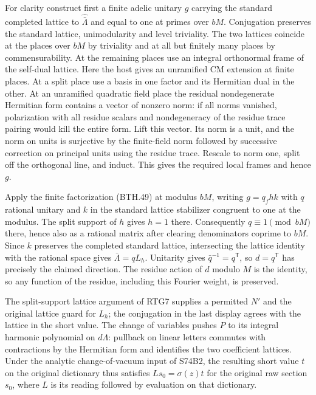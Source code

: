 For clarity construct first a finite adelic unitary $g$ carrying the
standard completed lattice to $\widehat{\bar\Lambda}$ and equal to
one at primes over $bM$. Conjugation preserves the standard lattice,
unimodularity and level triviality. The two lattices coincide at the
places over $bM$ by triviality and at all but finitely many places by
commensurability. At the remaining places use an integral orthonormal
frame of the self-dual lattice. Here the host gives an unramified CM
extension at finite places. At a split place use a basis in one factor
and its Hermitian dual in the other. At an unramified quadratic field
place the residual nondegenerate Hermitian form contains a vector of
nonzero norm: if all norms vanished, polarization with all residue
scalars and nondegeneracy of the residue trace pairing would kill the
entire form. Lift this vector. Its norm is a unit, and the norm on
units is surjective by the finite-field norm followed by successive
correction on principal units using the residue trace. Rescale to norm
one, split off the orthogonal line, and induct. This gives the required
local frames and hence $g$.

Apply the finite factorization (BTH.49) at modulus $bM$, writing
$g=q_f h k$ with $q$ rational unitary and $k$ in the standard
lattice stabilizer congruent to one at the modulus. The split support
of $h$ gives $h=1$ there. Consequently $q\equiv1\pmod{bM}$
there, hence also as a rational matrix after clearing denominators
coprime to $bM$. Since $k$ preserves the completed standard lattice,
intersecting the lattice identity with the rational space gives
$\bar\Lambda=qL_h$. Unitarity gives $\bar q^{-1}=q^{\mathsf T}$,
so $d=q^{\mathsf T}$ has precisely the claimed direction.
The residue action of $d$ modulo $M$ is the identity, so any function
of the residue, including this Fourier weight, is preserved.

The split-support lattice argument of RTG7 supplies a permitted $N'$
and the original lattice guard for $L_h$; the conjugation in the last
display agrees with the lattice in the short value. The change of
variables pushes $P$ to its integral harmonic polynomial on
$d\Lambda$: pullback on linear letters commutes with contractions by
the Hermitian form and identifies the two coefficient lattices.
Under the analytic change-of-vacuum input of S74B2, the resulting
short value $t$ on the original dictionary thus satisfies
$L s_0=\sigma(z)t$ for the original raw section $s_0$,
where $L$ is its reading followed by evaluation on that dictionary.

